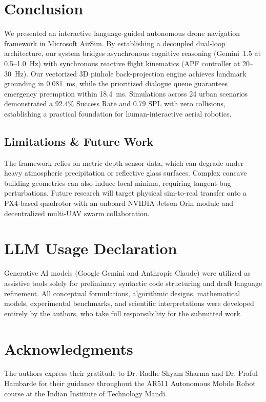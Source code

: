 \documentclass[conference]{IEEEtran}
\begin{document}
\section{Conclusion}
We presented an interactive language-guided autonomous drone navigation framework in Microsoft AirSim. By establishing a decoupled dual-loop architecture, our system bridges asynchronous cognitive reasoning (Gemini~1.5 at 0.5--1.0~Hz) with synchronous reactive flight kinematics (APF controller at 20--30~Hz). Our vectorized 3D pinhole back-projection engine achieves landmark grounding in 0.081~ms, while the prioritized dialogue queue guarantees emergency preemption within 18.4~ms. Simulations across 24 urban scenarios demonstrated a 92.4\% Success Rate and 0.79 SPL with zero collisions, establishing a practical foundation for human-interactive aerial robotics.

\subsection{Limitations \& Future Work}
The framework relies on metric depth sensor data, which can degrade under heavy atmospheric precipitation or reflective glass surfaces. Complex concave building geometries can also induce local minima, requiring tangent-bug perturbations. Future research will target physical sim-to-real transfer onto a PX4-based quadrotor with an onboard NVIDIA Jetson Orin module and decentralized multi-UAV swarm collaboration.

\section*{LLM Usage Declaration}
Generative AI models (Google Gemini and Anthropic Claude) were utilized as assistive tools solely for preliminary syntactic code structuring and draft language refinement. All conceptual formulations, algorithmic designs, mathematical models, experimental benchmarks, and scientific interpretations were developed entirely by the authors, who take full responsibility for the submitted work.

\section*{Acknowledgments}
The authors express their gratitude to Dr. Radhe Shyam Sharma and Dr. Praful Hambarde for their guidance throughout the AR511 Autonomous Mobile Robot course at the Indian Institute of Technology Mandi.

{\scriptsize
\def\IEEEbibitemsep{0pt plus 0.2pt}


}
\end{document}
